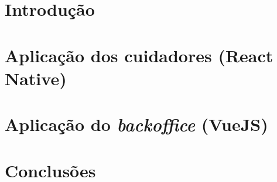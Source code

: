 \documentclass[a4paper]{article}
\begin{document}
\pagebreak
\tableofcontents

\pagebreak
\section{Introdução}


\pagebreak
\section{Aplicação dos cuidadores (React Native)}


\pagebreak
\section{Aplicação do \textit{backoffice} (VueJS)}


\pagebreak
\section{Conclusões}


\newpage


\end{document}
